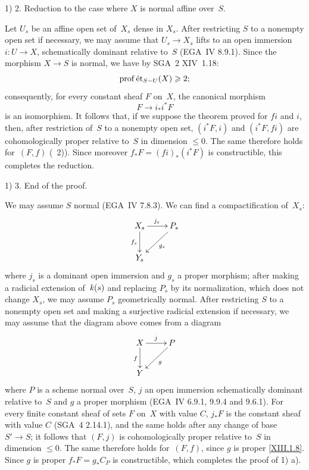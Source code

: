 1) 2. Reduction to the case where $X$ is normal affine over~$S$.

Let $U_s$ be an affine open set of~$X_s$ dense in $X_s$. After
restricting $S$ to a nonempty open set if necessary, we may assume that $U_s
\to X_s$ lifts to an open immersion $i\colon U\to X$,
schematically dominant relative to~$S$ (EGA~IV
8.9.1). Since the morphism $X \to S$ is normal, we have by
SGA~2 XIV~1.18:
$$
\operatorname{prof} \mathrm{\acute{e}t}_{S- U} (X) \geqslant 2  ;
$$
consequently, for every constant sheaf $F$ on~$X$, the canonical
morphism
$$
F \to i_*i^*F
$$
is an isomorphism. It follows that, if we suppose the
theorem proved for $fi$ and $i$, then, after
restriction of~$S$ to a nonempty open set, $(i^*F,i)$ and $(i^*F,fi)$
are cohomologically proper relative to~$S$ in dimension
$\le 0$. The same therefore holds for~$(F,f)$ (~2)). Since moreover $f_* F=(fi)_*(i^*F)$ is constructible, this
completes the reduction.

1) 3. End of the proof.

We may assume $S$ normal (EGA~IV 7.8.3). We can find a
compactification of~$X_s$:
$$
\xymatrix{ X_s \ar[r]^{j_s} \ar[d]_{f_s} & P_s \ar[ld]^{g_s} \\ Y_s }
$$
where $j_s$ is a dominant open immersion and $g_s$ a
proper morphism; after making a radicial extension of~$\mathit{k}(s)$ and
replacing $P_s$ by its normalization, which does not change $X_s$, we
may assume $P_s$ geometrically normal. After
restricting $S$ to a nonempty open set and making a surjective
radicial extension if necessary, we may assume that the diagram above
comes from a diagram
$$
\xymatrix{ X \ar[r]^{j} \ar[d]_{f} & P \ar[ld]^{g} \\ Y }
$$
where $P$ is a scheme normal over~$S$, $j$ an open immersion
schematically dominant relative to~$S$ and $g$ a
proper morphism (EGA~IV 6.9.1, 9.9.4 and 9.6.1). For every finite
constant sheaf of sets $F$ on~$X$ with value $C$, $j_*F$ is the
constant sheaf with value $C$ (SGA~4 2.14.1), and the same holds
after any change of base $S' \to S$; it
follows that $(F,j)$ is cohomologically proper relative
to~$S$ in dimension $\le 0$. The same therefore holds for~$(F,f)$,
since $g$ is proper \eqref{XIII.1.8}. Since $g$ is proper
$f_*F=g_*C_P$ is constructible, which completes the
proof of 1)\kern2pt a).


